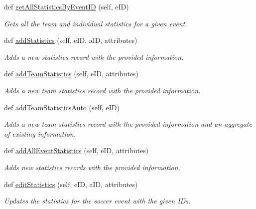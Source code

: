 \begin{DoxyCompactItemize}
def \hyperlink{classhandler_1_1soccer__event_1_1_soccer_event_handler_ab6bd0417ab481b45ecab9b2d2c9e738b}{get\+All\+Statistics\+By\+Event\+ID} (self, e\+ID)
\begin{DoxyCompactList}\small\item\em Gets all the team and individual statistics for a given event. \end{DoxyCompactList}\item 
def \hyperlink{classhandler_1_1soccer__event_1_1_soccer_event_handler_a5b83ffd31f33b20729be14b58ebfa117}{add\+Statistics} (self, e\+ID, a\+ID, attributes)
\begin{DoxyCompactList}\small\item\em Adds a new statistics record with the provided information. \end{DoxyCompactList}\item 
def \hyperlink{classhandler_1_1soccer__event_1_1_soccer_event_handler_aeee6cd8f3e7f2d165e75e45623b94553}{add\+Team\+Statistics} (self, e\+ID, attributes)
\begin{DoxyCompactList}\small\item\em Adds a new team statistics record with the provided information. \end{DoxyCompactList}\item 
def \hyperlink{classhandler_1_1soccer__event_1_1_soccer_event_handler_a7efe15076e99de5236ae8b4be54ebaa0}{add\+Team\+Statistics\+Auto} (self, e\+ID)
\begin{DoxyCompactList}\small\item\em Adds a new team statistics record with the provided information and an aggregate of existing information. \end{DoxyCompactList}\item 
def \hyperlink{classhandler_1_1soccer__event_1_1_soccer_event_handler_a3ce48adca1bff4e7741e6fc4690b8220}{add\+All\+Event\+Statistics} (self, e\+ID, attributes)
\begin{DoxyCompactList}\small\item\em Adds new statistics records with the provided information. \end{DoxyCompactList}\item 
def \hyperlink{classhandler_1_1soccer__event_1_1_soccer_event_handler_ad48fd75bebcc1203dea9abd9e9f8f8f8}{edit\+Statistics} (self, e\+ID, a\+ID, attributes)
\begin{DoxyCompactList}\small\item\em Updates the statistics for the soccer event with the given I\+Ds. \end{DoxyCompactList}\item 

\end{DoxyCompactItemize}
